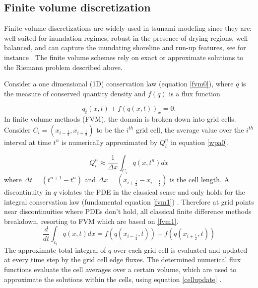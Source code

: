 \documentclass[11pt,a4paper]{article}
\begin{document}
	\subsection{Finite volume discretization}
Finite volume discretizations are widely used in tsunami modeling since they are: well suited for inundation regimes, robust in the presence of drying regions, well-balanced, and can capture the inundating shoreline and run-up features, see for instance \citet{ge:2008,ge:2011,george2006finite,be-ge-le-ma:2011,bi2014finite,leveque2002finite,ba-le-mi-ro:2003}. The finite volume schemes rely on exact or approximate solutions to the Riemann problem described above.

Consider a one dimensional (1D) conservation law  (equation \eqref{fvm0}),  where $q$ is the measure of conserved quantity density and $f(q)$ is a flux function

	\begin{equation}
		q_{t}(x,t) + f(q(x,t))_{x} = 0.
		\label{fvm0}
	\end{equation}	
	In finite volume methods (FVM), the domain is broken down into grid cells. Consider $C_{i} = (x_{i-\frac{1}{2}},x_{i+\frac{1}{2}})$ to be the $i^{th}$ grid cell, the average value over the $i^{th}$ interval at time $t^{n}$ is numerically approximated by $Q_{i}^{n}$ in equation \eqref{wpa0}.
	
	\begin{equation}
		Q_{i}^{n} \approx \dfrac{1}{\Delta x} \int_{C_{i}}q(x,t^{n})dx
		\label{wpa0}
	\end{equation}
	where $\Delta t = (t^{n+1} - t^{n})$ and  $\Delta x = (x_{i+\frac{1}{2}} - x_{i-\frac{1}{2}})$ is the cell length. A discontinuity in $q$ violates the PDE in the classical sense and only holds for the integral conservation law (fundamental equation \eqref{fvm1}) \cite{leveque2002finite}. Therefore at grid points near discontinuities where PDEs don't hold, all classical finite difference methods breakdown, resorting to FVM which are based on \eqref{fvm1}. 	
	\begin{equation}
		\frac{d}{dt} \int_{c_{i}} q(x,t)dx = f(q(x_{i-\frac{1}{2}},t)) -  f(q(x_{i+\frac{1}{2}},t))
		\label{fvm1}
	\end{equation}	
	The approximate  total integral of $q$ over each grid cell is evaluated and updated at every time step by the grid cell edge fluxes. The determined numerical flux functions evaluate the  cell averages over a certain volume, which are used to approximate the solutions within the cells, using equation \eqref{cellupdate} \cite{le-ge-be:2011}.
	
\end{document}
